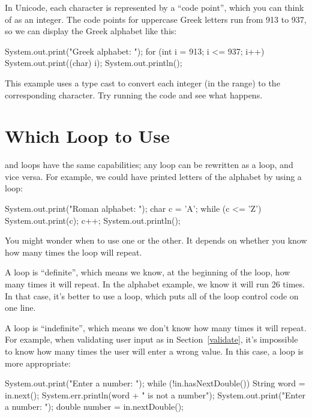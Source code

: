 In Unicode, each character is represented by a ``code point'', which you can think of as an integer.
The code points for uppercase Greek letters run from 913 to 937, so we can display the Greek alphabet like this:

\begin{code}
System.out.print("Greek alphabet: ");
for (int i = 913; i <= 937; i++) {
    System.out.print((char) i);
}
System.out.println();
\end{code}

This example uses a type cast to convert each integer (in the range) to the corresponding character.
Try running the code and see what happens.


\section{Which Loop to Use}

 and  loops have the same capabilities; any  loop can be rewritten as a  loop, and vice versa.
For example, we could have printed letters of the alphabet by using a  loop:

\begin{code}
System.out.print("Roman alphabet: ");
char c = 'A';
while (c <= 'Z') {
    System.out.print(c);
    c++;
}
System.out.println();
\end{code}

You might wonder when to use one or the other.  It depends on whether you know how many times the loop will repeat.

A  loop is ``definite'', which means we know, at the beginning of the loop, how many times it will repeat.
In the alphabet example, we know it will run 26 times.
In that case, it's better to use a  loop, which puts all of the loop control code on one line.

A  loop is ``indefinite'', which means we don't know how many times it will repeat.
For example, when validating user input as in Section~\ref{validate}, it's impossible to know how many times the user will enter a wrong value.
In this case, a  loop is more appropriate:

\begin{code}
System.out.print("Enter a number: ");
while (!in.hasNextDouble()) {
    String word = in.next();
    System.err.println(word + " is not a number");
    System.out.print("Enter a number: ");
}
double number = in.nextDouble();
\end{code}

